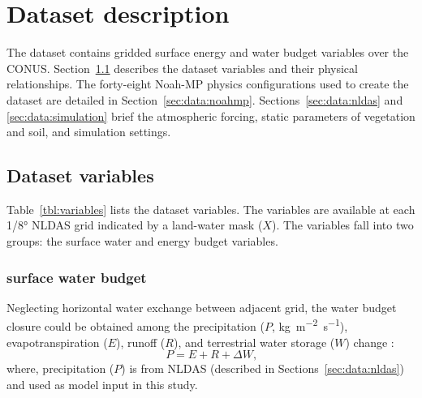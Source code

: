 \documentclass[essd]{copernicus}
\begin{document}
\section{Dataset description} \label{sec:data}

The dataset contains gridded surface energy and water budget variables over the
CONUS. Section~\ref{sec:data:variables} describes the dataset variables and
their physical relationships. The forty-eight Noah-MP physics configurations
used to create the dataset are detailed in Section~\ref{sec:data:noahmp}.
Sections~\ref{sec:data:nldas} and \ref{sec:data:simulation} brief the
atmospheric forcing, static parameters of vegetation and soil, and simulation
settings.


\subsection{Dataset variables} \label{sec:data:variables}

Table~\ref{tbl:variables} lists the dataset variables. The variables are
available at each 1/8° NLDAS grid indicated by a land-water mask
($X$). The variables fall into two groups: the surface water and energy budget
variables.



\subsubsection{surface water budget}

Neglecting horizontal water exchange between adjacent grid, the water budget
closure could be obtained among the precipitation ($P$,
\unit{kg~m^{-2}~s^{-1}}), evapotranspiration ($E$), runoff ($R$), and
terrestrial water storage ($W$) change \citep{zheng2020JAMES}:
\begin{equation}
    P = E + R + \Delta W \text{,}
\end{equation}
where, precipitation ($P$) is from NLDAS (described in
Sections~\ref{sec:data:nldas}) and used as model input in this study.
\end{document}
